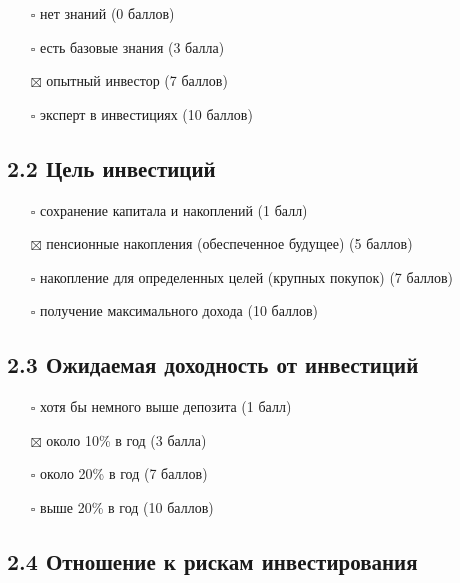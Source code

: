 \documentclass[11pt]{article}
\providecommand{\tightlist}{%
      \setlength{\itemsep}{0pt}\setlength{\parskip}{0pt}}
\begin{document}
\begin{itemize}
\tightlist
\item[$\square$]
  нет знаний (0 баллов)
\item[$\square$]
  есть базовые знания (3 балла)
\item[$\boxtimes$]
  опытный инвестор (7 баллов)
\item[$\square$]
  эксперт в инвестициях (10 баллов)
\end{itemize}

\subsection{2.2 Цель
инвестиций}\label{ux446ux435ux43bux44c-ux438ux43dux432ux435ux441ux442ux438ux446ux438ux439}

\begin{itemize}
\tightlist
\item[$\square$]
  сохранение капитала и накоплений (1 балл)
\item[$\boxtimes$]
  пенсионные накопления (обеспеченное будущее) (5 баллов)
\item[$\square$]
  накопление для определенных целей (крупных покупок) (7 баллов)
\item[$\square$]
  получение максимального дохода (10 баллов)
\end{itemize}

\subsection{2.3 Ожидаемая доходность от
инвестиций}\label{ux43eux436ux438ux434ux430ux435ux43cux430ux44f-ux434ux43eux445ux43eux434ux43dux43eux441ux442ux44c-ux43eux442-ux438ux43dux432ux435ux441ux442ux438ux446ux438ux439}

\begin{itemize}
\tightlist
\item[$\square$]
  хотя бы немного выше депозита (1 балл)
\item[$\boxtimes$]
  около 10\% в год (3 балла)
\item[$\square$]
  около 20\% в год (7 баллов)
\item[$\square$]
  выше 20\% в год (10 баллов)
\end{itemize}

\subsection{2.4 Отношение к рискам
инвестирования}\label{ux43eux442ux43dux43eux448ux435ux43dux438ux435-ux43a-ux440ux438ux441ux43aux430ux43c-ux438ux43dux432ux435ux441ux442ux438ux440ux43eux432ux430ux43dux438ux44f}
\end{document}
